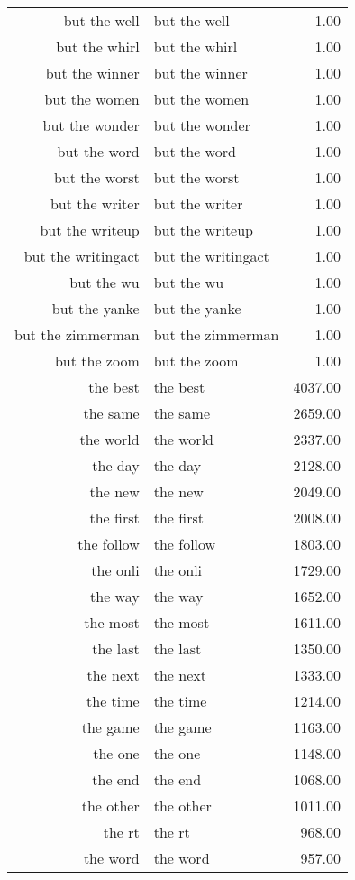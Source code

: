 \begin{table}[ht]
\begin{tabular}{rlr}
  but the well & but the well & 1.00 \\ 
  but the whirl & but the whirl & 1.00 \\ 
  but the winner & but the winner & 1.00 \\ 
  but the women & but the women & 1.00 \\ 
  but the wonder & but the wonder & 1.00 \\ 
  but the word & but the word & 1.00 \\ 
  but the worst & but the worst & 1.00 \\ 
  but the writer & but the writer & 1.00 \\ 
  but the writeup & but the writeup & 1.00 \\ 
  but the writingact & but the writingact & 1.00 \\ 
  but the wu & but the wu & 1.00 \\ 
  but the yanke & but the yanke & 1.00 \\ 
  but the zimmerman & but the zimmerman & 1.00 \\ 
  but the zoom & but the zoom & 1.00 \\ 
  the best & the best & 4037.00 \\ 
  the same & the same & 2659.00 \\ 
  the world & the world & 2337.00 \\ 
  the day & the day & 2128.00 \\ 
  the new & the new & 2049.00 \\ 
  the first & the first & 2008.00 \\ 
  the follow & the follow & 1803.00 \\ 
  the onli & the onli & 1729.00 \\ 
  the way & the way & 1652.00 \\ 
  the most & the most & 1611.00 \\ 
  the last & the last & 1350.00 \\ 
  the next & the next & 1333.00 \\ 
  the time & the time & 1214.00 \\ 
  the game & the game & 1163.00 \\ 
  the one & the one & 1148.00 \\ 
  the end & the end & 1068.00 \\ 
  the other & the other & 1011.00 \\ 
  the rt & the rt & 968.00 \\ 
  the word & the word & 957.00 \\ 

\end{tabular}
\end{table}
